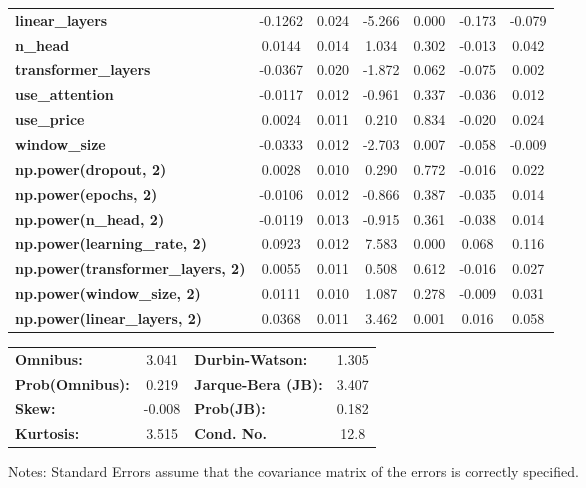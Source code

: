 \begin{center}
\begin{tabular}{lcccccc}
\textbf{linear\_layers}                   &      -0.1262  &        0.024     &    -5.266  &         0.000        &       -0.173    &       -0.079     \\
\textbf{n\_head}                          &       0.0144  &        0.014     &     1.034  &         0.302        &       -0.013    &        0.042     \\
\textbf{transformer\_layers}              &      -0.0367  &        0.020     &    -1.872  &         0.062        &       -0.075    &        0.002     \\
\textbf{use\_attention}                   &      -0.0117  &        0.012     &    -0.961  &         0.337        &       -0.036    &        0.012     \\
\textbf{use\_price}                       &       0.0024  &        0.011     &     0.210  &         0.834        &       -0.020    &        0.024     \\
\textbf{window\_size}                     &      -0.0333  &        0.012     &    -2.703  &         0.007        &       -0.058    &       -0.009     \\
\textbf{np.power(dropout, 2)}             &       0.0028  &        0.010     &     0.290  &         0.772        &       -0.016    &        0.022     \\
\textbf{np.power(epochs, 2)}              &      -0.0106  &        0.012     &    -0.866  &         0.387        &       -0.035    &        0.014     \\
\textbf{np.power(n\_head, 2)}             &      -0.0119  &        0.013     &    -0.915  &         0.361        &       -0.038    &        0.014     \\
\textbf{np.power(learning\_rate, 2)}      &       0.0923  &        0.012     &     7.583  &         0.000        &        0.068    &        0.116     \\
\textbf{np.power(transformer\_layers, 2)} &       0.0055  &        0.011     &     0.508  &         0.612        &       -0.016    &        0.027     \\
\textbf{np.power(window\_size, 2)}        &       0.0111  &        0.010     &     1.087  &         0.278        &       -0.009    &        0.031     \\
\textbf{np.power(linear\_layers, 2)}      &       0.0368  &        0.011     &     3.462  &         0.001        &        0.016    &        0.058     \\
\bottomrule
\end{tabular}
\begin{tabular}{lclc}
\textbf{Omnibus:}       &  3.041 & \textbf{  Durbin-Watson:     } &    1.305  \\
\textbf{Prob(Omnibus):} &  0.219 & \textbf{  Jarque-Bera (JB):  } &    3.407  \\
\textbf{Skew:}          & -0.008 & \textbf{  Prob(JB):          } &    0.182  \\
\textbf{Kurtosis:}      &  3.515 & \textbf{  Cond. No.          } &     12.8  \\
\bottomrule
\end{tabular}
\end{center}

Notes: \newline
 [1] Standard Errors assume that the covariance matrix of the errors is correctly specified.